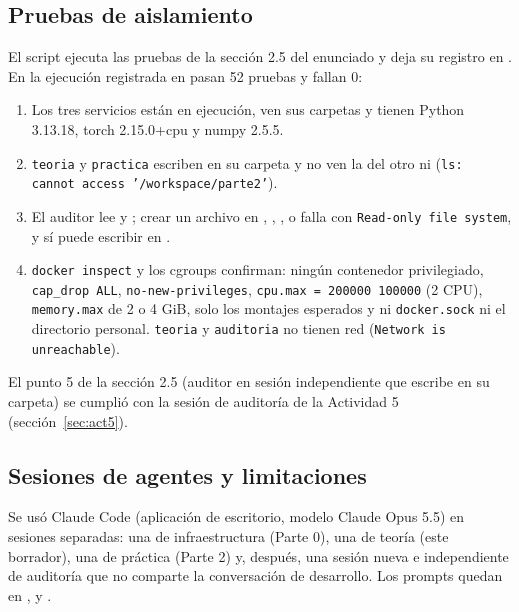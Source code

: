\documentclass[10pt]{article}
\begin{document}
\subsection{Pruebas de aislamiento}
El script  ejecuta las pruebas de la sección 2.5 del
enunciado y deja su registro en . En la ejecución registrada en
 pasan 52 pruebas y fallan 0:
\begin{sloppypar}
\begin{enumerate}[nosep]
  \item Los tres servicios están en ejecución, ven sus carpetas y tienen Python 3.13.18,
        torch 2.15.0+cpu y numpy 2.5.5.
  \item \texttt{teoria} y \texttt{practica} escriben en su carpeta y no ven la del otro ni
         (\texttt{ls: cannot access '/workspace/parte2'}).
  \item El auditor lee  y ; crear un archivo en
        , , ,  o
         falla con \texttt{Read-only file system}, y sí puede escribir en
        .
  \item \texttt{docker inspect} y los cgroups confirman: ningún contenedor privilegiado,
        \texttt{cap\_drop ALL}, \texttt{no-new-privileges}, \texttt{cpu.max = 200000 100000}
        (2 CPU), \texttt{memory.max} de 2 o 4 GiB, solo los montajes esperados y ni
        \texttt{docker.sock} ni el directorio personal. \texttt{teoria} y \texttt{auditoria} no
        tienen red (\texttt{Network is unreachable}).
\end{enumerate}
\end{sloppypar}
El punto 5 de la sección 2.5 (auditor en sesión independiente que escribe en su carpeta) se cumplió
con la sesión de auditoría de la Actividad 5 (sección~\ref{sec:act5}).

\subsection{Sesiones de agentes y limitaciones}\label{sec:sesiones}
Se usó Claude Code (aplicación de escritorio, modelo Claude Opus 5.5) en sesiones separadas: una de
infraestructura (Parte 0), una de teoría (este borrador), una de práctica (Parte 2) y, después, una
sesión nueva e independiente de auditoría que no comparte la conversación de desarrollo. Los prompts
quedan en ,  y .
\end{document}
